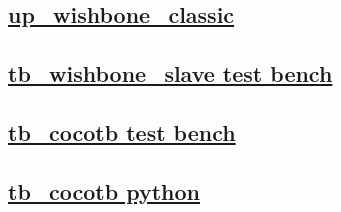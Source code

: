 \documentclass{article}
\begin{document}
  


  \subsection{\href{../files/up_wishbone_classic-v.html}{up\_wishbone\_classic}}
  \subsection{\href{../files2/tb_wishbone_slave-v.html}{tb\_wishbone\_slave test bench}}
  \subsection{\href{../files2/tb_cocotb-v.html}{tb\_cocotb test bench}}
  \subsection{\href{../files2/tb_cocotb-py.html}{tb\_cocotb python}}
\end{document}
